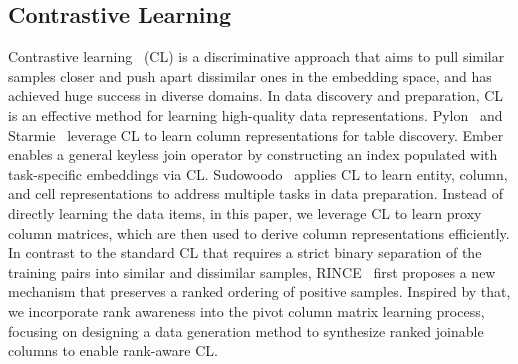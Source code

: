 
\subsection{Contrastive Learning}
Contrastive learning~\cite{Moco} (CL) is a discriminative approach that aims to pull similar samples closer and push apart dissimilar ones in the embedding space, and has achieved huge success in diverse domains.
In data discovery and preparation, CL is an effective method for learning high-quality data representations. Pylon~\cite{Pylon} and Starmie~\cite{starmine} leverage CL to learn column representations for table discovery. Ember~\cite{Ember}  enables a general keyless join operator by constructing an index populated with task-specific embeddings via CL. Sudowoodo~\cite{Sudowoodo} applies CL to learn entity, column, and cell representations to address multiple tasks in data preparation. Instead of directly learning the data items, in this paper, we leverage CL to learn proxy column matrices, which are then used to derive column representations efficiently. In contrast to the standard CL that requires a strict binary separation of the training pairs into similar and dissimilar samples, RINCE~\cite{2022ranking} first proposes a new mechanism that preserves a ranked ordering of positive samples. Inspired by that, we incorporate rank awareness into the pivot column matrix learning process, focusing on designing a data generation method to synthesize ranked joinable columns to enable rank-aware CL.
